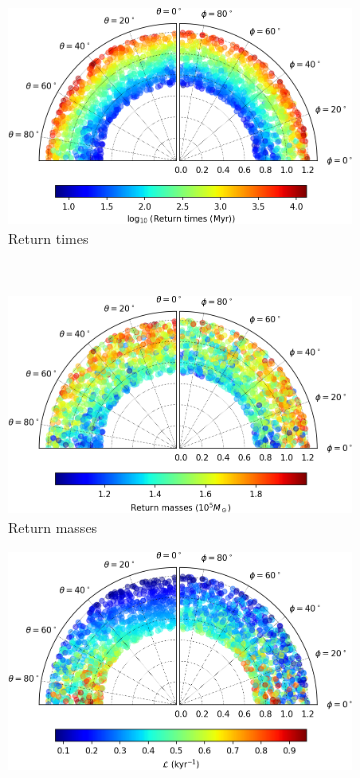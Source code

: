 \begin{figure}[h]
    \centering
    \begin{subfigure}[t]{0.4\textwidth}
        \includegraphics[width = \textwidth]{"../Files/Week 13/images/8_time"}
        \caption{Return times}
    \end{subfigure}
    ~ 
    \begin{subfigure}[t]{0.4\textwidth}
        \includegraphics[width=\textwidth]{"../Files/Week 13/images/8_mass"}
        \caption{Return masses}
    \end{subfigure}
    \begin{subfigure}[t]{0.4\textwidth}
        \includegraphics[width=\textwidth]{"../Files/Week 13/images/8_lyapunov"}

\end{subfigure}
\end{figure}
